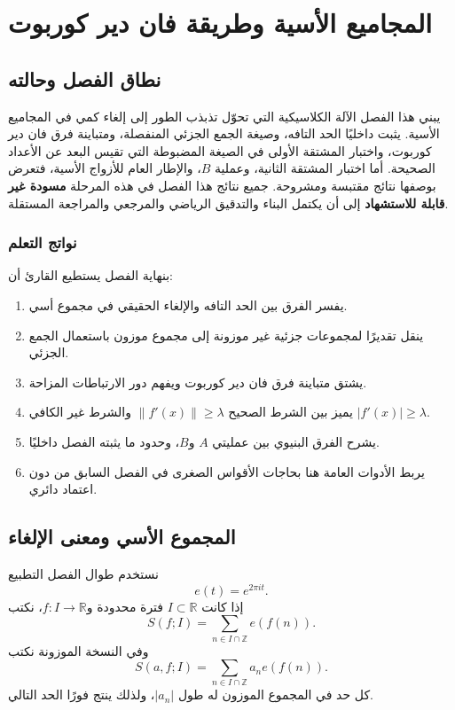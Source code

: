 \chapter{المجاميع الأسية وطريقة فان دير كوربوت}
\label{ch:exponential-sums-van-der-corput}

\section*{نطاق الفصل وحالته}

يبني هذا الفصل الآلة الكلاسيكية التي تحوّل تذبذب الطور إلى إلغاء كمي في المجاميع الأسية. يثبت داخليًا الحد التافه، وصيغة الجمع الجزئي المنفصلة، ومتباينة فرق فان دير كوربوت، واختبار المشتقة الأولى في الصيغة المضبوطة التي تقيس البعد عن الأعداد الصحيحة. أما اختبار المشتقة الثانية، وعملية \(B\)، والإطار العام للأزواج الأسية، فتعرض بوصفها نتائج مقتبسة ومشروحة. جميع نتائج هذا الفصل في هذه المرحلة \textbf{مسودة غير قابلة للاستشهاد} إلى أن يكتمل البناء والتدقيق الرياضي والمرجعي والمراجعة المستقلة.

\subsection*{نواتج التعلم}

بنهاية الفصل يستطيع القارئ أن:
\begin{enumerate}
\item يفسر الفرق بين الحد التافه والإلغاء الحقيقي في مجموع أسي.
\item ينقل تقديرًا لمجموعات جزئية غير موزونة إلى مجموع موزون باستعمال الجمع الجزئي.
\item يشتق متباينة فرق فان دير كوربوت ويفهم دور الارتباطات المزاحة.
\item يميز بين الشرط الصحيح \(\|f'(x)\|\ge\lambda\) والشرط غير الكافي \(|f'(x)|\ge\lambda\).
\item يشرح الفرق البنيوي بين عمليتي \(A\) و\(B\)، وحدود ما يثبته الفصل داخليًا.
\item يربط الأدوات العامة هنا بحاجات الأقواس الصغرى في الفصل السابق من دون اعتماد دائري.
\end{enumerate}

\section{المجموع الأسي ومعنى الإلغاء}

نستخدم طوال الفصل التطبيع
\[
e(t)=e^{2\pi i t}.
\]
إذا كانت \(I\subset\mathbb R\) فترة محدودة و\(f:I\to\mathbb R\)، نكتب
\[
S(f;I)=\sum_{n\in I\cap\mathbb Z} e(f(n)).
\]
وفي النسخة الموزونة نكتب
\[
S(a,f;I)=\sum_{n\in I\cap\mathbb Z} a_n e(f(n)).
\]
كل حد في المجموع الموزون له طول \(|a_n|\)، ولذلك ينتج فورًا الحد التالي.

